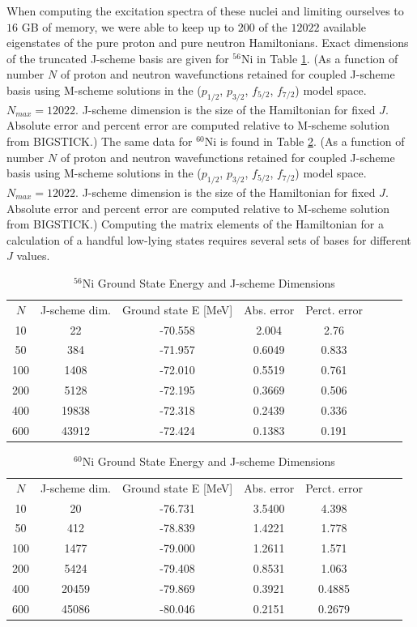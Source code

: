 When 
computing the excitation spectra of these nuclei and limiting ourselves to $16$ GB of memory, we were able
to keep up to $200$ of the $12022$ available eigenstates of the pure proton and
pure neutron Hamiltonians.  
Exact dimensions of the truncated J-scheme basis are given for $^{56}$Ni in Table \ref{56nit}.
(As a function of number $N$ of proton and neutron wavefunctions retained
for coupled J-scheme basis using M-scheme solutions in the ($p_{1/2}$, $p_{3/2}$, $f_{5/2}$, $f_{7/2}$) model
space. $N_{max}=12022$. J-scheme dimension is the size of the Hamiltonian for fixed $J$. Absolute error and
percent error are computed relative to M-scheme solution from BIGSTICK.)
The same data for $^{60}$Ni is found in Table \ref{60nit}. 
(As a function of number $N$ of proton and neutron wavefunctions retained
for coupled J-scheme basis using M-scheme solutions in the ($p_{1/2}$, $p_{3/2}$, $f_{5/2}$, $f_{7/2}$) model
space. $N_{max}=12022$. J-scheme dimension is the size of the Hamiltonian for fixed $J$. Absolute error and
percent error are computed relative to M-scheme solution from BIGSTICK.)
Computing the matrix elements of the Hamiltonian for a calculation of a handful low-lying states
requires several sets of bases for different $J$ values. 

\begin{table}[h]
    \caption{$^{56}$Ni Ground State Energy and J-scheme Dimensions}
    \label{56nit}
\begin{tabular}
    {c c c c c c c c}
    \hline 
    \hline
$N$ & J-scheme dim. & Ground state E [MeV] & Abs. error & Perct. error \\
10  &22    &   -70.558 & 2.004  & 2.76 \\
50  &384   &   -71.957 & 0.6049 & 0.833\\
100 &1408  &   -72.010 & 0.5519 & 0.761\\
200 &5128  &   -72.195 & 0.3669 & 0.506\\
400 &19838 &   -72.318 & 0.2439 & 0.336\\
600 &43912 &   -72.424 & 0.1383 & 0.191\\
    \hline
    \hline
\end{tabular}
\end{table}
\begin{table}[h]
    \caption{$^{60}$Ni Ground State Energy and J-scheme Dimensions}
    \label{60nit}
\begin{tabular}
    {c c c c c c c c}
    \hline 
    \hline
$N$ & J-scheme dim.   & Ground state E [MeV] & Abs. error & Perct. error \\
10  & 20    & -76.731 & 3.5400 & 4.398 \\
50  & 412   & -78.839 & 1.4221& 1.778 \\
100 & 1477  & -79.000 & 1.2611& 1.571 \\
200 & 5424  & -79.408 & 0.8531& 1.063 \\
400 & 20459 & -79.869 & 0.3921& 0.4885 \\
600 & 45086 & -80.046 & 0.2151& 0.2679 \\
    \hline
    \hline
\end{tabular}
\end{table}



